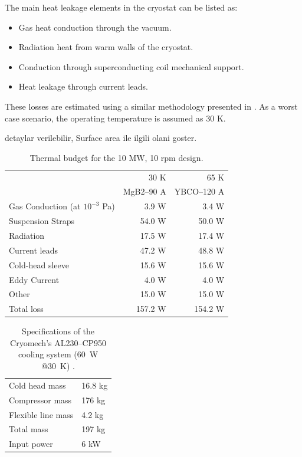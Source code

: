 \documentclass[12pt]{iopart}
\begin{document}
The main heat leakage elements in the cryostat can be listed as:

\begin{itemize}
  \item Gas heat conduction through the vacuum.
  \item Radiation heat from  warm walls of the cryostat.  \item Conduction through superconducting coil mechanical support.
  \item Heat leakage through current leads.
\end{itemize}

These losses are estimated using a similar methodology presented in \cite{Abrahamsen2012, Simons2013}. As a worst case scenario, the operating temperature is assumed as 30 K.

detaylar verilebilir, Surface area ile ilgili olani goster.

\begin{table}
  \centering
  \begin{tabular}{lrr}
& 30 K & 65 K \\
& MgB2--90 A & YBCO--120 A \\
\hline
Gas Conduction (at $10^{-3}$ Pa) & 3.9 W & 3.4 W\\
Suspension Straps & 54.0 W & 50.0 W\\
Radiation & 17.5 W & 17.4 W\\
Current leads & 47.2 W & 48.8 W \\
Cold-head sleeve & 15.6 W & 15.6 W\\
Eddy Current & 4.0 W & 4.0 W\\
Other & 15.0 W & 15.0 W\\
\hline
Total loss & 157.2 W & 154.2 W\\
\hline
 \end{tabular}
  \caption{Thermal budget for the 10 MW, 10 rpm design. }
  \label{10MW_thermal_budget}
\end{table}

\begin{table}
  \centering
  \begin{tabular}{ll}
\hline
Cold head mass & 16.8 kg \\
Compressor mass & 176 kg \\
Flexible line mass & 4.2 kg \\
Total mass & 197 kg \\
Input power & 6 kW \\
\hline
 \end{tabular}
  \caption{Specifications of the Cryomech's AL230--CP950 cooling system (60~W @30~K) \cite{Cryomech2007}.}
  \label{cryocooler_spec}
\end{table}
\end{document}
